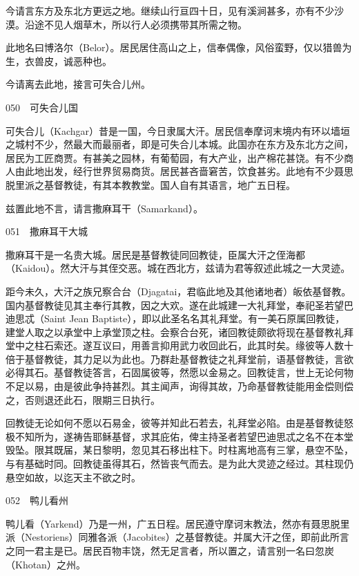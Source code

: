 \documentclass[12pt,UTF8]{ctexbook}
\begin{document}
今请言东方及东北方更远之地。继续山行亘四十日，见有溪涧甚多，亦有不少沙漠。沿途不见人烟草木，所以行人必须携带其所需之物。

此地名曰博洛尔（Belor）。居民居住高山之上，信奉偶像，风俗蛮野，仅以猎兽为生，衣兽皮，诚恶种也。

今请离去此地，接言可失合儿州。





050　可失合儿国

可失合儿（Kachgar）昔是一国，今日隶属大汗。居民信奉摩诃末境内有环以墙垣之城村不少，然最大而最丽者，即是可失合儿本城。此国亦在东方及东北方之间，居民为工匠商贾。有甚美之园林，有葡萄园，有大产业，出产棉花甚饶。有不少商人由此地出发，经行世界贸易商货。居民甚吝啬窘苦，饮食甚劣。此地有不少聂思脱里派之基督教徒，有其本教教堂。国人自有其语言，地广五日程。

兹置此地不言，请言撒麻耳干（Samarkand）。





051　撒麻耳干大城

撒麻耳干是一名贵大城。居民是基督教徒同回教徒，臣属大汗之侄海都（Kaidou）。然大汗与其侄交恶。城在西北方，兹请为君等叙述此城之一大灵迹。

距今未久，大汗之族兄察合台（Djagatai，君临此地及其他诸地者）皈依基督教。国内基督教徒见其主奉行其教，因之大欢。遂在此城建一大礼拜堂，奉祀圣若望巴迪思忒（Saint Jean Baptiste），即以此圣名名其礼拜堂。有一美石原属回教徒，建堂人取之以承堂中上承堂顶之柱。会察合台死，诸回教徒颇欲将现在基督教礼拜堂中之柱石索还。遂互议曰，用善言抑用武力收回此石，此其时矣。缘彼等人数十倍于基督教徒，其力足以为此也。乃群赴基督教徒之礼拜堂前，语基督教徒，言欲必得其石。基督教徒答言，石固属彼等，然愿以金易之。回教徒言，世上无论何物不足以易，由是彼此争持甚烈。其主闻声，询得其故，乃命基督教徒能用金偿则偿之，否则退还此石，限期三日执行。

回教徒无论如何不愿以石易金，彼等并知此石若去，礼拜堂必陷。由是基督教徒怒极不知所为，遂祷告耶稣基督，求其庇佑，俾主持圣者若望巴迪思忒之名不在本堂毁坠。限其既届，某日黎明，忽见其石移出柱下。时柱离地高有三掌，悬空不坠，与有基础时同。回教徒虽得其石，然皆丧气而去。是为此大灵迹之经过。其柱现仍悬空如故，以迄天主不欲之时。





052　鸭儿看州

鸭儿看（Yarkend）乃是一州，广五日程。居民遵守摩诃末教法，然亦有聂思脱里派（Nestoriens）同雅各派（Jacobites）之基督教徒。并属大汗之侄，即前此所言之同一君主是已。居民百物丰饶，然无足言者，所以置之，请言别一名曰忽炭（Khotan）之州。
\end{document}
